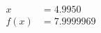 \documentclass[preview]{standalone}
\begin{document}
\begin{align*}
x &= 4.9950\\f(x) &= 7.9999969
\end{align*}
\end{document}
